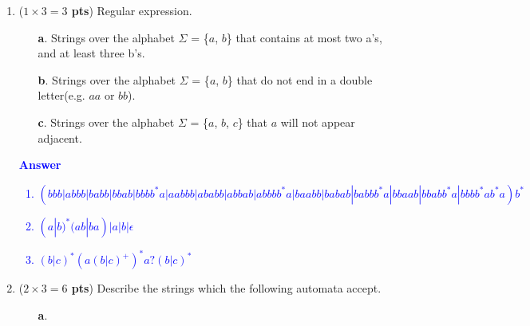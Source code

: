 \documentclass[10pt]{article}
\newcommand {\pts}[1]{({\bf #1 pts})}
\begin{document}
\begin{enumerate}
    \item \pts{$1\times 3=3$} Regular expression.
          \begin{enumerate}
              \item[\textbf{a}.] Strings over the alphabet $\Sigma$ = \{$a$, $b$\} that contains at most two a’s, and at least three b’s.
              \item[\textbf{b}.] Strings over the alphabet $\Sigma$ = \{$a$, $b$\} that do not end in a double letter(e.g. $aa$ or $bb$).
              \item[\textbf{c}.] Strings over the alphabet $\Sigma$ = \{$a$, $b$, $c$\} that $a$ will not appear adjacent.
          \end{enumerate}
          \textcolor{blue}{
              \textbf{Answer}
              \begin{enumerate}
                  \item $(bbb|abbb|babb|bbab|bbbb^*a|aabbb|ababb|abbab|abbbb^*a|baabb|babab|babbb^*a|bbaab|bbabb^*a|bbbb^*ab^*a)b^*$
                  \item $(a|b)^*(ab|ba)|a|b|\epsilon$
                  \item $(b|c)^*(a(b|c)^+)^*a?(b|c)^*$
              \end{enumerate}
          }
    \item \pts{$2\times 3=6$} Describe the strings which the following automata accept.
          \begin{enumerate}
              \item[] \textbf{a}.
                  \\


\end{enumerate}
\end{enumerate}
\end{document}
